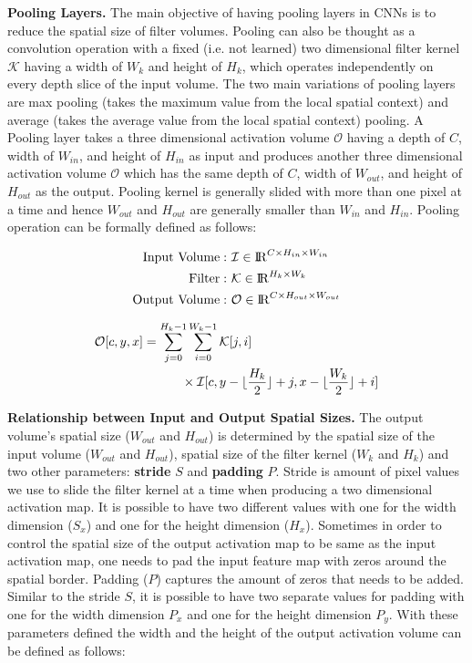 \noindent \textbf{Pooling Layers.} The main objective of having pooling layers in CNNs is to reduce the spatial size of filter volumes. Pooling can also be thought as a convolution operation with a fixed (i.e. not learned) two dimensional filter kernel $\mathcal{K}$ having a width of $W_k$ and height of $H_k$, which operates independently on every depth slice of the input volume. The two main variations of pooling layers are max pooling (takes the maximum value from the local spatial context) and average (takes the average value from the local spatial context) pooling. A Pooling layer takes a three dimensional activation volume $\mathcal{O}$ having a depth of $C$, width of $W_{in}$, and height of $H_{in}$ as input and produces another three dimensional activation volume $\mathcal{O}$ which has the same depth of $C$, width of $W_{out}$, and height of $H_{out}$ as the output. Pooling kernel is generally slided with more than one pixel at a time and hence $W_{out}$ and $H_{out}$ are generally smaller than $W_{in}$ and $H_{in}$. Pooling operation can be formally defined as follows:

\vspace{-2mm}
\begin{align}
\text{Input Volume}:&~ \mathcal{I} \in \mathcal{\rm I\!R}^{C \times H_{in} \times W_{in}}\\
\text{Filter}:&~ \mathcal{K} \in \mathcal{\rm I\!R}^{H_{k} \times W_{k}}\\
\text{Output Volume}:&~ \mathcal{O} \in \mathcal{\rm I\!R}^{C \times H_{out} \times W_{out}}
\end{align}

\begin{equation}
\label{eqn:pool_operator}
\begin{split}
\mathcal{O}[c,y,x] &= \sum_{j=0}^{H_k-1} \sum_{i=0}^{W_k-1} \mathcal{K}[j, i] \\ & \quad \quad \quad \times \mathcal{I}[c,y-\lfloor\frac{H_k}{2}\rfloor+j,x-\lfloor\frac{W_k}{2}\rfloor+i]
\end{split}
\end{equation}


\noindent \textbf{Relationship between Input and Output Spatial Sizes.} The output volume's spatial size ($W_{out}$ and $H_{out}$) is determined by the spatial size of the input volume ($W_{out}$ and $H_{out}$), spatial size of the filter kernel ($W_k$ and $H_k$) and two other parameters: \textbf{stride} $S$ and \textbf{padding} $P$. Stride is amount of pixel values we use to slide the filter kernel at a time when producing a two dimensional activation map. It is possible to have two different values with one for the width dimension ($S_x$) and one for the height dimension ($H_x$). Sometimes in order to control the spatial size of the output activation map to be same as the input activation map, one needs to pad the input feature map with zeros around the spatial border. Padding ($P$) captures the amount of zeros that needs to be added. Similar to the stride $S$, it is possible to have two separate values for padding with one for the width dimension $P_x$ and one for the height dimension $P_y$. With these parameters defined the width and the height of the output activation volume can be defined as follows:

